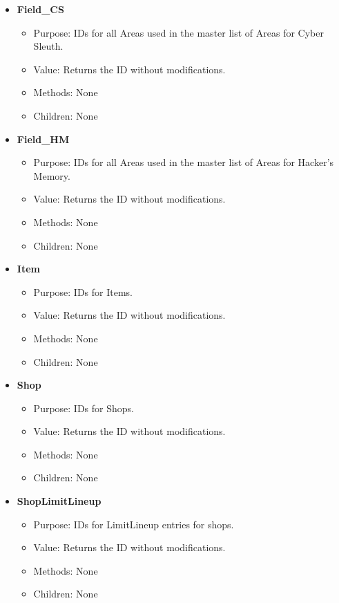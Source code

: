 \documentclass{article}
\begin{document}
\begin{itemize}
	\item \textbf{Field\_CS}
	\begin{itemize}
		\item Purpose: IDs for all Areas used in the master list of Areas for Cyber Sleuth.
		\item Value: Returns the ID without modifications.
		\item Methods: None
		\item Children: None
	\end{itemize}
	
	\item \textbf{Field\_HM}
	\begin{itemize}
		\item Purpose: IDs for all Areas used in the master list of Areas for Hacker's Memory.
		\item Value: Returns the ID without modifications.
		\item Methods: None
		\item Children: None
	\end{itemize}
	
	\item \textbf{Item}
	\begin{itemize}
		\item Purpose: IDs for Items.
		\item Value: Returns the ID without modifications.
		\item Methods: None
		\item Children: None
	\end{itemize}
	
	\item \textbf{Shop}
	\begin{itemize}
		\item Purpose: IDs for Shops.
		\item Value: Returns the ID without modifications.
		\item Methods: None
		\item Children: None
	\end{itemize}
	
	\item \textbf{ShopLimitLineup}
	\begin{itemize}
		\item Purpose: IDs for LimitLineup entries for shops.
		\item Value: Returns the ID without modifications.
		\item Methods: None
		\item Children: None
	\end{itemize}
	

\end{itemize}
\end{document}
